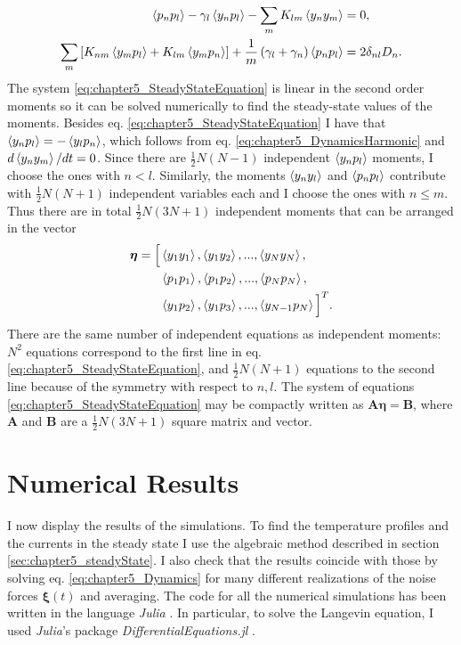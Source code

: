 %
\begin{align}
  \expval{p_n p_l} - \gamma_l\expval{y_n p_l} - \sum_m K_{lm}\expval{y_n y_m} &= 0,\nonumber\\
  \sum_{m}\left[ K_{nm}\expval{y_m p_l} + K_{lm}\expval{y_m p_n} \right] + \frac{1}{m}\left( \gamma_l + \gamma_n \right)\expval{p_n p_l} &= 2 \delta_{nl} D_n.
  \label{eq:chapter5_SteadyStateEquation}
\end{align}
%
The system \eqref{eq:chapter5_SteadyStateEquation} is linear in the second order moments so it can be solved numerically to find the steady-state values of the moments. Besides eq. \eqref{eq:chapter5_SteadyStateEquation} I have that $\expval{y_n p_l} = - \expval{y_l p_n}$, which follows from eq. \eqref{eq:chapter5_DynamicsHarmonic} and $d\expval{y_n y_m}/dt = 0$. Since there are $\frac{1}{2}N(N-1)$ independent $\expval{y_n p_l}$ moments, I choose the ones with $n<l$. Similarly, the moments $\expval{y_n y_l}$ and $\expval{p_n p_l}$ contribute with $\frac{1}{2}N(N+1)$ independent variables each and I choose the ones with $n\leq m$. Thus there are in total $\frac{1}{2}N(3N+1)$ independent moments that can be arranged in the vector
%
\begin{align}
    \bm\eta = \Big[ &\expval{y_1 y_1},\expval{y_1 y_2},...,\expval{y_N y_N},\nonumber\\
    &\expval{p_1 p_1},\expval{p_1 p_2},...,\expval{p_N p_N},\nonumber\\
    &\expval{y_1 p_2},\expval{y_1 p_3},...,\expval{y_{N-1} p_N}\Big]^T.
    \label{eq:chapter5_CovariancesVector}
\end{align}
%
There are the same number of independent equations
as independent moments: $N^2$
equations correspond to the first line in eq.  \eqref{eq:chapter5_SteadyStateEquation}, and $\frac{1}{2}N(N+1)$ equations
to the second line because of the symmetry with respect to $n,l$. The system of equations \eqref{eq:chapter5_SteadyStateEquation} may be compactly written as $\mathbf{A}\boldsymbol\eta = \mathbf{B}$, where $\mathbf{A}$ and $\mathbf{B}$ are a $\frac{1}{2}N(3N+1)$ square matrix and vector.

\section{Numerical Results\label{sec:chapter5_NumericalResults}}


I now display the results of the simulations. To find the temperature profiles and the currents in the steady state I use the algebraic method described in section \ref{sec:chapter5_steadyState}. I also check that the results coincide with those by solving eq. \eqref{eq:chapter5_Dynamics} for many different realizations of the noise forces $\bm\xi (t)$ and averaging. The code for all the numerical simulations has been written in the language \textit{Julia} \cite{Bezanson2012,Bezanson2017}. In particular, to solve the Langevin equation, I used \textit{Julia}'s package \textit{DifferentialEquations.jl} \cite{Rackauckas2017}.

